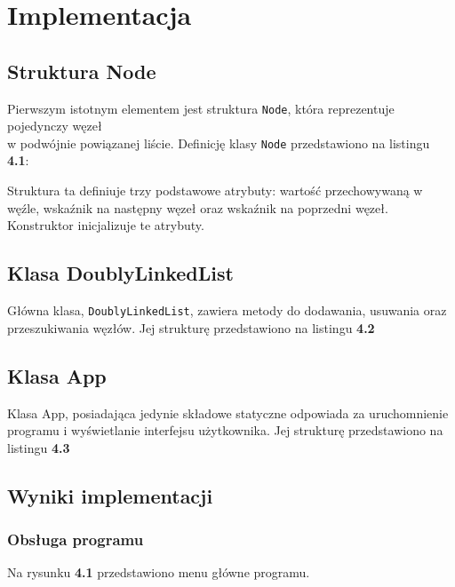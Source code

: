 \newpage
\section{Implementacja}		%

\subsection{Struktura Node}

Pierwszym istotnym elementem jest struktura \texttt{Node}, która reprezentuje pojedynczy węzeł \\
w podwójnie powiązanej liście. Definicję klasy \texttt{Node} przedstawiono na listingu \textbf{4.1}:



Struktura ta definiuje trzy podstawowe atrybuty: wartość przechowywaną w węźle, wskaźnik na następny węzeł oraz wskaźnik na poprzedni węzeł. Konstruktor inicjalizuje te atrybuty.

\subsection{Klasa DoublyLinkedList}

Główna klasa, \texttt{DoublyLinkedList}, zawiera metody do dodawania, usuwania oraz przeszukiwania węzłów.
Jej strukturę przedstawiono na listingu \textbf{4.2}



\subsection{Klasa App}

Klasa App, posiadająca jedynie składowe statyczne odpowiada za uruchomnienie programu i wyświetlanie interfejsu użytkownika.
Jej strukturę przedstawiono na listingu \textbf{4.3}



\subsection{Wyniki implementacji}

\subsubsection{Obsługa programu}
Na rysunku \textbf{4.1} przedstawiono menu główne programu.

